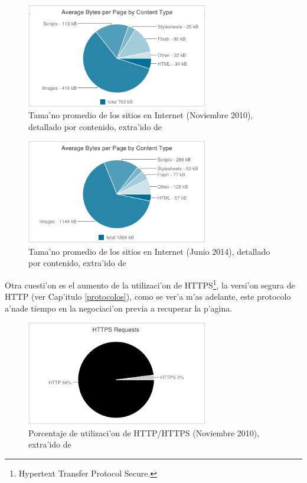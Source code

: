 \begin{figure}[h]
  	\centering
	\includegraphics[width=300px]{img/grafSitios2010}
	\caption{\small Tama'no promedio de los sitios en Internet (Noviembre 2010), detallado por contenido, extra'ido de \cite{httparchive}}
	\label{grafSitios2010}
\end{figure}

\begin{figure}[h]
  	\centering
	\includegraphics[width=300px]{img/grafSitios2014}
	\caption{\small Tama'no promedio de los sitios en Internet (Junio 2014), detallado por contenido, extra'ido de \cite{httparchive}}
	\label{grafSitios2014}
\end{figure}

\clearpage

Otra cuesti'on es el aumento de la utilizaci'on de HTTPS\footnote{Hypertext Transfer Protocol Secure.}, la versi'on segura de HTTP (ver Cap'itulo \ref{protocolos}), como se ver'a m'as adelante, este protocolo a'nade tiempo en la negociaci'on previa a recuperar la p'agina.

\begin{figure}[h]
  	\centering
	\includegraphics[width=300px]{img/httphttps2010}
	\caption{\small Porcentaje de utilizaci'on de HTTP/HTTPS (Noviembre 2010), extra'ido de \cite{httparchive}}
	\label{httphttps2010}
\end{figure}

